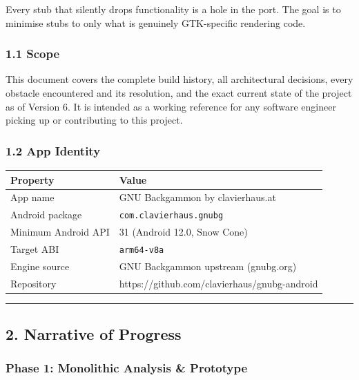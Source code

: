 \documentclass[11pt,a4paper]{article}
\begin{document}
Every stub that silently drops functionality is a hole in the port. The
goal is to minimise stubs to only what is genuinely GTK-specific
rendering code.

\subsubsection{1.1 Scope}\label{scope}

This document covers the complete build history, all architectural
decisions, every obstacle encountered and its resolution, and the exact
current state of the project as of Version 6. It is intended as a
working reference for any software engineer picking up or contributing
to this project.

\subsubsection{1.2 App Identity}\label{app-identity}

\begin{longtable}[]{@{}ll@{}}
\toprule\noalign{}
Property & Value \\
\midrule\noalign{}
\endhead
\bottomrule\noalign{}
\endlastfoot
App name & GNU Backgammon by clavierhaus.at \\
Android package & \texttt{com.clavierhaus.gnubg} \\
Minimum Android API & 31 (Android 12.0, Snow Cone) \\
Target ABI & \texttt{arm64-v8a} \\
Engine source & GNU Backgammon upstream (gnubg.org) \\
Repository & https://github.com/clavierhaus/gnubg-android \\
\end{longtable}

\begin{center}\rule{0.5\linewidth}{0.5pt}\end{center}

\subsection{2. Narrative of Progress}\label{narrative-of-progress}

\subsubsection{Phase 1: Monolithic Analysis \&
Prototype}\label{phase-1-monolithic-analysis-prototype}
\end{document}
